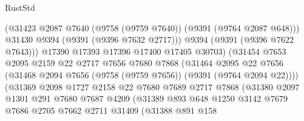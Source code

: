 \begin{lexlean}{RustStd}
\begin{coremodule}
                                  (@31423
                                    @2087
                                    @7640
                                    (@9758 (@9759 @7640))
                                    (@9391 (@9764 @2087 @648)))
                                  @31430
                                  @9394
                                  (@9391 (@9396 @7632 @2717)))
                                @9394
                                (@9391 (@9396 @7622 @7643)))
                              @17390
                              @17393
                              @17396
                              @17400
                              @17405
                              @30703)
                            (@31454
                              @7653
                              @2095
                              @2159
                              @22
                              @2717
                              @7656
                              @7680
                              @7868
                              (@31464
                                @2095
                                @22
                                @7656
                                (@31468
                                  @2094
                                  @7656
                                  (@9758 (@9759 @7656))
                                  (@9391 (@9764 @2094 @22))))
                              (@31369
                                @2098
                                @1727
                                @2158
                                @22
                                @7680
                                @7689
                                @2717
                                @7868
                                (@31380
                                  @2097
                                  @1301
                                  @291
                                  @7680
                                  @7687
                                  @4209
                                  (@31389
                                    @893
                                    @648
                                    @1250
                                    @3142
                                    @7679
                                    @7686
                                    @2705
                                    @7662
                                    @2711
                                    @31409
                                    (@31388
                                      @891
                                      @158

\end{coremodule}
\end{lexlean}
